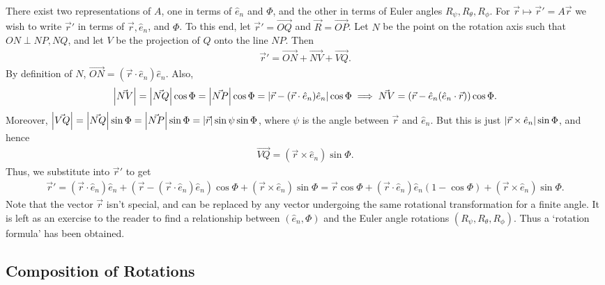 There exist two representations of $A$, one in terms of $\hat{e}_{n}$ and $\Phi$, and the other in terms of Euler angles $R_{\psi},R_{\theta},R_{\phi}$. For $\vec{r} \mapsto \vec{r}' = A\vec{r}$ we wish to write $\vec{r}'$ in terms of $\vec{r},\hat{e}_{n}$, and $\Phi$. To this end, let $\vec{r}' = \vec{OQ}$ and $\vec{R} = \vec{OP}$. Let $N$ be the point on the rotation axis such that $ON \perp NP,NQ$, and let $V$ be the projection of $Q$ onto the line $NP$. Then
\begin{align}
    \vec{r}' = \vec{ON} + \vec{NV} + \vec{VQ}.
\end{align}
By definition of $N$, $\vec{ON} = (\vec{r} \cdot \hat{e}_{n}) \hat{e}_{n}$. Also,
\begin{align}
    \left| \vec{NV} \right| = \left| \vec{NQ} \right| \cos \Phi = \left| \vec{NP} \right| \cos \Phi = \left| \vec{r} - (\vec{r} \cdot \hat{e}_{n}) \hat{e}_{n} \right| \cos \Phi \implies \vec{NV} = (\vec{r} - \hat{e}_{n}(\hat{e}_{n} \cdot \vec{r})) \cos \Phi.
\end{align}
Moreover, $\left| \vec{VQ} \right| = \left| \vec{NQ} \right| \sin \Phi = \left| \vec{NP} \right| \sin \Phi = \left| \vec{r} \right| \sin \psi \sin \Phi$, where $\psi$ is the angle between $\vec{r}$ and $\hat{e}_{n}$. But this is just $\left| \vec{r} \times \hat{e}_{n} \right| \sin \Phi$, and hence 
\begin{align}
    \vec{VQ} = (\vec{r} \times \hat{e}_{n}) \sin \Phi.
\end{align}
Thus, we substitute into $\vec{r}'$ to get
\begin{align}
    \vec{r}' = (\vec{r} \cdot \hat{e}_{n}) \hat{e}_{n} + (\vec{r} - (\vec{r} \cdot \hat{e}_{n}) \hat{e}_{n}) \cos \Phi + (\vec{r} \times \hat{e}_{n}) \sin \Phi = \vec{r} \cos \Phi + (\vec{r} \cdot \hat{e}_{n}) \hat{e}_{n} ( 1-\cos\Phi) + (\vec{r} \times \hat{e}_{n}) \sin \Phi.
\end{align}
Note that the vector $\vec{r}$ isn't special, and can be replaced by any vector undergoing the same rotational transformation for a finite angle. It is left as an exercise to the reader to find a relationship between $(\hat{e}_{n},\Phi)$ and the Euler angle rotations $(R_{\psi},R_{\theta},R_{\phi})$. Thus a `rotation formula' has been obtained.

\subsection{Composition of Rotations}

